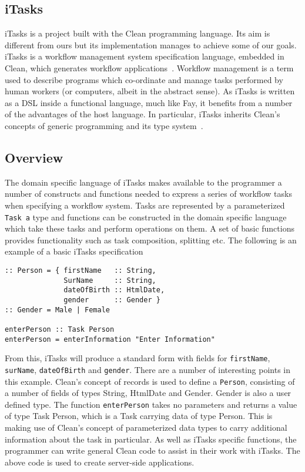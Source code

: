 \subsection{iTasks}
iTasks is a project built with the Clean programming language. Its aim
is different from ours but its implementation manages to achieve some of
our goals. iTasks is a workflow management system specification language,
embedded in Clean, which generates workflow applications~\cite{iTasks}. Workflow management
is a term used to describe programs which co-ordinate and manage tasks
performed by human workers (or computers, albeit in the abstract sense).
As iTasks is written as a DSL inside a functional language, much like Fay, 
it benefits from a
number of the advantages of the host language. In particular, iTasks inherits
Clean's concepts of generic programming and its type system~\cite[pp.9]{iTasks}. 

\subsection{Overview}
The domain specific language of iTasks makes available to the programmer a
number of constructs and functions needed to express a series of workflow
tasks when specifying a workflow system. Tasks are represented by a 
parameterized \verb!Task a!
type and functions can be constructed in the domain specific language which
take these tasks and perform operations on them. A set of basic functions
provides functionality such as task composition, splitting etc. The following
is an example of a basic iTasks specification

\begin{verbatim}
:: Person = { firstName   :: String, 
              SurName     :: String,
              dateOfBirth :: HtmlDate,
              gender      :: Gender }
:: Gender = Male | Female

enterPerson :: Task Person
enterPerson = enterInformation "Enter Information"
\end{verbatim}

From this, iTasks will produce a standard form with fields for \verb!firstName!, 
\verb!surName!, \verb!dateOfBirth! and \verb!gender!. There are a number of interesting points
in this example. Clean's concept of records is used to define a \verb!Person!,
consisting of a number of fields of types String, HtmlDate and Gender. 
Gender is also a user defined type. The function \verb!enterPerson! takes no
parameters and returns a value of type Task Person, which is a Task
carrying data of type Person. This is making use of Clean's concept 
of parameterized data types to carry additional information about the 
task in particular. As well as iTasks specific functions, the programmer
can write general Clean code to assist in their work with iTasks.
The above code is used to create server-side applications.

